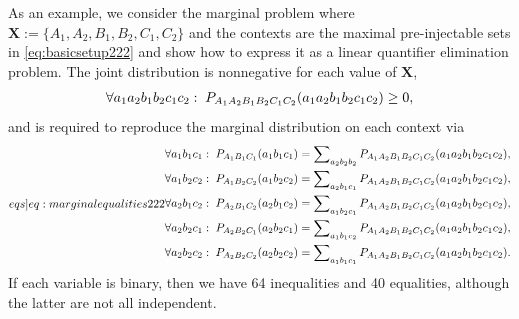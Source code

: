 
As an example, we consider the marginal problem where $\bm{X} := \{ A_1, A_2, B_1, B_2, C_1, C_2\}$ and the contexts are the 
maximal pre-injectable sets in \cref{eq:basicsetup222} and show how to express it as a linear quantifier elimination problem.
The joint distribution is nonnegative for each value of $\bm{X}$,
\begin{align}\label{eq:nonnegativity}
\forall{a_1 a_2 b_1 b_2 c_1 c_2}:\; \pdf[A_1 A_2 B_1 B_2 C_1 C_2]{a_1 a_2 b_1 b_2 c_1 c_2} \geq 0,
\end{align}
and is required to reproduce the marginal distribution on each context via
\begin{align}\label[eqs]{eq:marginalequalities222}
\begin{split}
&\forall{a_1 b_1 c_1}:\;\pdf[A_1 B_1 C_1]{a_1 b_1 c_1} = \sum\nolimits_{a_2 b_2 b_2}\pdf[A_1 A_2 B_1 B_2 C_1 C_2]{a_1 a_2 b_1 b_2 c_1 c_2},\\
&\forall{a_1 b_2 c_2}:\;\pdf[A_1 B_2 C_2]{a_1 b_2 c_2} = \sum\nolimits_{a_2 b_1 c_1}\pdf[A_1 A_2 B_1 B_2 C_1 C_2]{a_1 a_2 b_1 b_2 c_1 c_2},\\
&\forall{a_2 b_1 c_2}:\;\pdf[A_2 B_1 C_2]{a_2 b_1 c_2} = \sum\nolimits_{a_1 b_2 c_1}\pdf[A_1 A_2 B_1 B_2 C_1 C_2]{a_1 a_2 b_1 b_2 c_1 c_2},\\
&\forall{a_2 b_2 c_1}:\;\pdf[A_2 B_2 C_1]{a_2 b_2 c_1} = \sum\nolimits_{a_1 b_1 c_2}\pdf[A_1 A_2 B_1 B_2 C_1 C_2]{a_1 a_2 b_1 b_2 c_1 c_2},\\
&\forall{a_2 b_2 c_2}:\;\pdf[A_2 B_2 C_2]{a_2 b_2 c_2} = \sum\nolimits_{a_1 b_1 c_1}\pdf[A_1 A_2 B_1 B_2 C_1 C_2]{a_1 a_2 b_1 b_2 c_1 c_2}.
\end{split}
\end{align}
If each variable is binary, then we have 64 inequalities and 40 equalities, although the latter are not all independent. 

